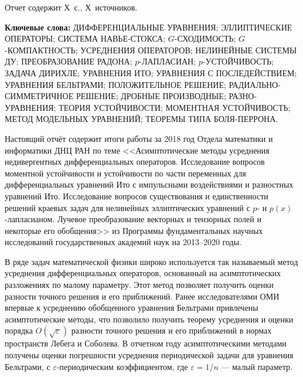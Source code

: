 \Referat %

Отчет содержит Х~с., Х~источников.%

\bigskip
\textbf{ Ключевые
	слова:}
ДИФФЕРЕНЦИАЛЬНЫЕ УРАВНЕНИЯ; ЭЛЛИПТИЧЕСКИЕ ОПЕРАТОРЫ; СИСТЕМА НАВЬЕ-СТОКСА; $G$-СХОДИМОСТЬ; $G$-КОМПАКТНОСТЬ; УСРЕДНЕНИЯ ОПЕРАТОРОВ; НЕЛИНЕЙНЫЕ СИСТЕМЫ ДУ;
ПРЕОБРАЗОВАНИЕ РАДОНА;
$p$-ЛАПЛАСИАН; $p$-УСТОЙЧИВОСТЬ; ЗАДАЧА ДИРИХЛЕ; УРАВНЕНИЯ ИТО; УРАВНЕНИЯ С ПОСЛЕДЕЙСТВИЕМ;  УРАВНЕНИЯ БЕЛЬТРАМИ; ПОЛОЖИТЕЛЬНОЕ РЕШЕНИЕ; РАДИАЛЬНО-СИММЕТРИЧНОЕ РЕШЕНИЕ; ДРОБНЫЕ ПРОИЗВОДНЫЕ; РАЗНО- УРАВНЕНИЯ;  ТЕОРИЯ УСТОЙЧИВОСТИ; МОМЕНТНАЯ УСТОЙЧИВОСТЬ; МЕТОД МОДЕЛЬНЫХ УРАВНЕНИЙ; ТЕОРЕМЫ ТИПА БОЛЯ-ПЕРРОНА.



\bigskip

Настоящий отчёт содержит итоги работы за 2018 год Отдела математики и информатики ДНЦ РАН по теме
<<Асимптотические методы усреднения недивергентных дифференциальных операторов. Исследование вопросов моментной устойчивости и устойчивости по части переменных для дифференциальных уравнений Ито с импульсными воздействиями и разностных уравнений Ито. Исследование вопросов существования и единственности решений краевых задач для нелинейных эллиптических уравнений с $p$- и $p(x)$-лапласианом. Лучевое преобразование векторных и тензорных полей и некоторые его обобщения>>
из Программы фундаментальных научных исследований государственных академий наук на 2013–2020 годы.



В ряде задач математической физики широко используется так называемый метод усреднения дифференциальных операторов, основанный на асимптотических разложениях по малому параметру. Этот метод позволяет получить оценки разности точного решения и его приближений. 
Ранее исследователями ОМИ впервые к усреднению обобщенного уравнения Бельтрами привлечены асимптотические методы, что позволило получить теорему усреднения и оценки порядка $O(\sqrt{\varepsilon})$ разности точного решения и его приближений в нормах пространств Лебега и Соболева.
В отчетном году асимптотическими методами получены оценки погрешности усреднения периодической задачи для уравнения Бельтрами, с $\varepsilon$-периодическим коэффициентом, где $\varepsilon=1/n$  --- малый параметр.

